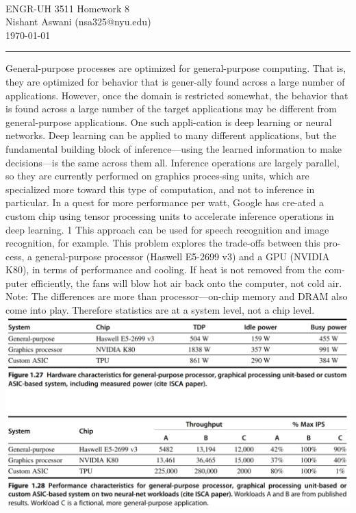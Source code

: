 \documentclass[11pt]{exam}
\makeatletter
\newcommand{\myname}{Nishant Aswani}
\newcommand{\myemail}{nsa325@nyu.edu}
\newcommand{\myhwtype}{Homework}
\newcommand{\myhwnum}{8}
\newcommand{\mycoursenumber}{ENGR-UH 3511}
\newcounter{questionCounter}
\newcounter{partCounter}[questionCounter]
\newenvironment{namedquestion}[1]{%
    \addtocounter{questionCounter}{1}%
    \setcounter{partCounter}{0}%
    \vspace{.2in}%
        \noindent{\bf #1}%
    \vspace{0.3em} \hrule \vspace{.1in}%
}{}
\makeatother
\begin{document}
\

{\newpage}


\thispagestyle{plain}
\begin{center}
  {\Large \mycoursenumber{} \myhwtype{} \myhwnum} \\
  \myname{} (\myemail{}) \\
  \today
\end{center}

\setcounter{questionCounter}{0}

\begin{namedquestion}{Problem 1.6 Case Study}

General-purpose processes are optimized for general-purpose computing. That is, they are optimized for behavior that is gener-ally found across a large number of applications. However, once the domain is restricted somewhat, the behavior that is found across a large number of the target applications may be different from general-purpose applications. One such appli-cation is deep learning or neural networks. Deep learning can be applied to many different applications, but the fundamental building block of inference—using the learned information to make decisions—is the same across them all. Inference operations are largely parallel, so they are currently performed on graphics proces-sing units, which are specialized more toward this type of computation, and not to inference in particular. In a quest for more performance per watt, Google has cre-ated a custom chip using tensor processing units to accelerate inference operations in deep learning. 1 This approach can be used for speech recognition and image recognition, for example. This problem explores the trade-offs between this pro-cess, a general-purpose processor (Haswell E5-2699 v3) and a GPU (NVIDIA K80), in terms of performance and cooling. If heat is not removed from the com-puter efficiently, the fans will blow hot air back onto the computer, not cold air. Note: The differences are more than processor—on-chip memory and DRAM also come into play. Therefore statistics are at a system level, not a chip level.\\

\begingroup
    \centering
    \medskip
    \includegraphics[width=\columnwidth]{Homework-Tex/img/16tb.png}
    \medskip
\endgroup

\end{namedquestion}
\end{document}
